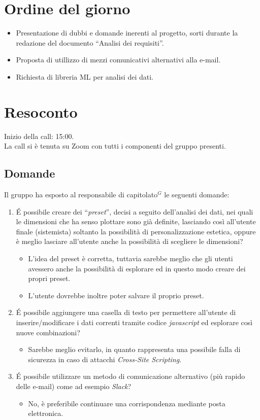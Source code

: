 \section{Ordine del giorno}

\begin{itemize}
	\item Presentazione di dubbi e domande inerenti al progetto, sorti durante la redazione del documento ``Analisi dei requisiti''.
	\item Proposta di utillizzo di mezzi comunicativi alternativi alla e-mail.
	\item Richiesta di libreria ML per analisi dei dati.
\end{itemize}

\section{Resoconto}

\noindent 
Inizio della call: 15:00. \\
\noindent La call si è tenuta su Zoom con tutti i componenti del gruppo presenti.
\subsection{Domande}
Il gruppo ha esposto al responsabile di capitolato$^{G}$ le seguenti domande:
\begin{enumerate}
	\item \' E possibile creare dei ``\textit{preset}'', decisi a seguito dell'analisi dei dati, nei quali le dimensioni che ha senso plottare sono già definite, lasciando così all'utente finale (sistemista) soltanto la possibilità di personalizzazione estetica, oppure è meglio lasciare all'utente anche la possibilità di scegliere le dimensioni?
	\begin{itemize}
		\item L'idea del preset è corretta, tuttavia sarebbe meglio che gli utenti avessero anche la possibilità di esplorare ed in questo modo creare dei propri preset.
		\item L'utente dovrebbe inoltre poter salvare il proprio preset.
	\end{itemize}
	\item \' E possibile aggiungere una casella di testo per permettere all'utente di inserire/modificare i dati correnti tramite codice \textit{javascript} ed esplorare così nuove combinazioni?
	\begin{itemize}
		\item Sarebbe meglio evitarlo, in quanto rappresenta una possibile falla di sicurezza in caso di attacchi \textit{Cross-Site Scripting}.
	\end{itemize}
	\item \'E possibile utilizzare un metodo di comunicazione alternativo (più rapido delle e-mail) come ad esempio \textit{Slack}?
	\begin{itemize}
		\item No, è preferibile continuare una corrispondenza mediante posta elettronica.
	\end{itemize}
	
\end{enumerate}

